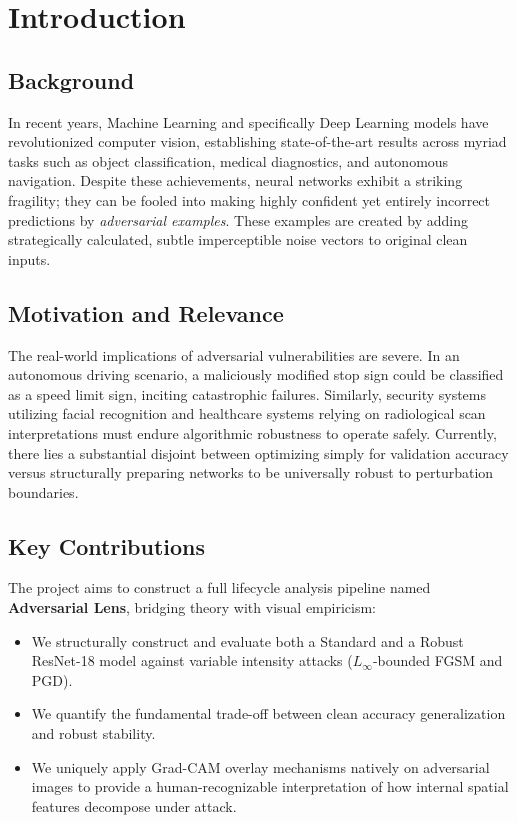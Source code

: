 \documentclass[12pt,a4paper]{article}
\begin{document}
\tableofcontents
\newpage

\section{Introduction}
\subsection{Background}
In recent years, Machine Learning and specifically Deep Learning models have revolutionized computer vision, establishing state-of-the-art results across myriad tasks such as object classification, medical diagnostics, and autonomous navigation. Despite these achievements, neural networks exhibit a striking fragility; they can be fooled into making highly confident yet entirely incorrect predictions by \textit{adversarial examples}. These examples are created by adding strategically calculated, subtle imperceptible noise vectors to original clean inputs.

\subsection{Motivation and Relevance}
The real-world implications of adversarial vulnerabilities are severe. In an autonomous driving scenario, a maliciously modified stop sign could be classified as a speed limit sign, inciting catastrophic failures. Similarly, security systems utilizing facial recognition and healthcare systems relying on radiological scan interpretations must endure algorithmic robustness to operate safely. Currently, there lies a substantial disjoint between optimizing simply for validation accuracy versus structurally preparing networks to be universally robust to perturbation boundaries.

\subsection{Key Contributions}
The project aims to construct a full lifecycle analysis pipeline named \textbf{Adversarial Lens}, bridging theory with visual empiricism:
\begin{itemize}
    \item We structurally construct and evaluate both a Standard and a Robust ResNet-18 model against variable intensity attacks ($L_\infty$-bounded FGSM and PGD).
    \item We quantify the fundamental trade-off between clean accuracy generalization and robust stability.
    \item We uniquely apply Grad-CAM overlay mechanisms natively on adversarial images to provide a human-recognizable interpretation of how internal spatial features decompose under attack.
\end{itemize}
\end{document}
